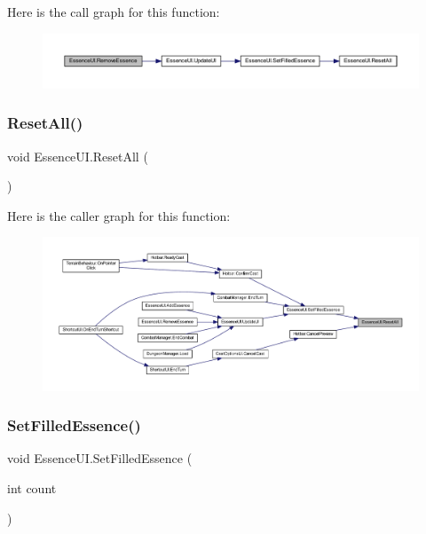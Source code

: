 Here is the call graph for this function\+:\nopagebreak
\begin{figure}[H]
\begin{center}
\leavevmode
\includegraphics[width=350pt]{class_essence_u_i_a39b3c1ec97a29130e2e8ab4050921ed6_cgraph}
\end{center}
\end{figure}
\mbox{\label{class_essence_u_i_a82a6c20070b4fd052eae20ba6e05487b}} 
\subsubsection{\texorpdfstring{ResetAll()}{ResetAll()}}
{\footnotesize\ttfamily void Essence\+U\+I.\+Reset\+All (\begin{DoxyParamCaption}{ }\end{DoxyParamCaption})}

Here is the caller graph for this function\+:\nopagebreak
\begin{figure}[H]
\begin{center}
\leavevmode
\includegraphics[width=350pt]{class_essence_u_i_a82a6c20070b4fd052eae20ba6e05487b_icgraph}
\end{center}
\end{figure}
\mbox{\label{class_essence_u_i_aac12f1c82310ceb94e259d9b6aa9bdfd}} 
\subsubsection{\texorpdfstring{SetFilledEssence()}{SetFilledEssence()}}
{\footnotesize\ttfamily void Essence\+U\+I.\+Set\+Filled\+Essence (\begin{DoxyParamCaption}\item[{int}]{count }\end{DoxyParamCaption})}


